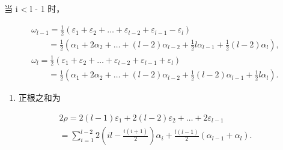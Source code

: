 当 i \textless{} l - 1 时，

\[
\begin{array}{l} \omega_ {l - 1} = \frac {1}{2} (\varepsilon_ {1} + \varepsilon_ {2} + \dots + \varepsilon_ {l - 2} + \varepsilon_ {l - 1} - \varepsilon_ {l}) \\ \qquad = \frac {1}{2} (\alpha_ {1} + 2 \alpha_ {2} + \dots + (l - 2) \alpha_ {l - 2} + \frac {1}{2} l \alpha_ {l - 1} + \frac {1}{2} (l - 2) \alpha_ {l}), \\ \omega_ {l} = \frac {1}{2} (\varepsilon_ {1} + \varepsilon_ {2} + \dots + \varepsilon_ {l - 2} + \varepsilon_ {l - 1} + \varepsilon_ {l}) \\ \qquad = \frac {1}{2} (\alpha_ {1} + 2 \alpha_ {2} + \dots + (l - 2) \alpha_ {l - 2} + \frac {1}{2} (l - 2) \alpha_ {l - 1} + \frac {1}{2} l \alpha_ {l}). \end{array}
\]

\begin{enumerate}
\def\labelenumi{(\Roman{enumi})}
\setcounter{enumi}{6}
\tightlist
\item
  正根之和为
\end{enumerate}

\[
\begin{array}{l} 2 \rho = 2 (l - 1) \varepsilon_ {1} + 2 (l - 2) \varepsilon_ {2} + \dots + 2 \varepsilon_ {l - 1} \\ = \sum_ {i = 1} ^ {l - 2} 2 (i l - \frac {i (i + 1)}{2}) \alpha_ {i} + \frac {l (l - 1)}{2} (\alpha_ {l - 1} + \alpha_ {l}). \end{array}
\]

